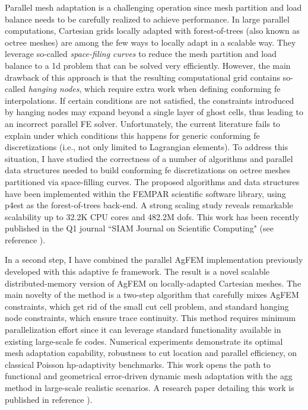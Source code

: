 \documentclass{article}
\begin{document}
 Parallel mesh adaptation is a challenging operation since mesh partition and load balance needs to be carefully realized to achieve performance.  In large parallel computations, Cartesian grids locally adapted with forest-of-trees (also known as octree meshes) are among the few ways to locally adapt in a scalable way. They leverage so-called \emph{space-filing curves} to reduce the mesh partition and load balance to a 1d problem that can be solved very efficiently. However, the main drawback of this approach is that the resulting computational grid contains so-called \emph{hanging nodes}, which require extra work when defining conforming \ac{fe} interpolations. If certain conditions are not satisfied, the constraints introduced by hanging nodes may expand beyond a single layer of ghost cells, thus leading to an incorrect parallel FE solver. Unfortunately, the current literature fails to explain under which conditions this happens for generic conforming \ac{fe} discretizations (i.e., not only limited to Lagrangian elements). To address this situation, I have studied the correctness of a number of algorithms and parallel data structures needed to build conforming \ac{fe} discretizations on octree meshes partitioned via space-filling curves.  The proposed algorithms and data structures have been implemented within the FEMPAR scientific software library, using p4est as the forest-of-trees back-end. A strong scaling study reveals remarkable scalability up to 32.2K CPU cores and 482.2M \acp{dof}. {This work has been recently published in the Q1 journal ``SIAM Journal on Scientific Computing"} (see reference \cite{badia_2019a} ).

 In a second step, I have combined the parallel AgFEM implementation previously developed with this adaptive \ac{fe} framework. The result is a novel scalable distributed-memory version of AgFEM on locally-adapted Cartesian meshes. The main novelty of the method is a two-step algorithm that carefully mixes AgFEM constraints, which get rid of the small cut cell problem, and standard hanging node constraints, which ensure trace continuity. This method requires minimum parallelization effort since it can leverage standard functionality available in existing large-scale \ac{fe} codes. Numerical experiments demonstrate its optimal mesh adaptation capability, robustness to cut location and parallel efficiency, on classical Poisson hp-adaptivity benchmarks. This work opens the path to functional and geometrical error-driven dynamic mesh adaptation with the \ac{agg} method in large-scale realistic scenarios. A research paper detailing this work is published in reference \cite{badia_2020a}).
\end{document}
